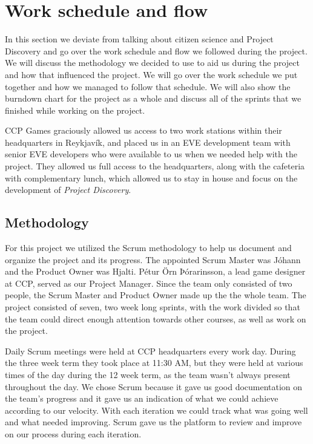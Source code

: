 \section{Work schedule and flow}\label{sec:workscheduleandflow}

In this section we deviate from talking about citizen science and Project Discovery and go over the work schedule and flow we followed during the project. We will discuss the methodology we decided to use to aid us during the project and how that influenced the project. We will go over the work schedule we put together and how we managed to follow that schedule. We will also show the burndown chart for the project as a whole and discuss all of the sprints that we finished while working on the project.

CCP Games graciously allowed us access to two work stations within their headquarters in Reykjavík, and placed us in an EVE development team with senior EVE developers who were available to us when we needed help with the project. They allowed us full access to the headquarters, along with the cafeteria with complementary lunch, which allowed us to stay in house and focus on the development of \emph{Project Discovery}.

\subsection{Methodology}
	For this project we utilized the Scrum methodology to help us document and organize the project and its progress. The appointed Scrum Master was Jóhann and the Product Owner was Hjalti. Pétur Örn Þórarinsson, a lead game designer at CCP, served as our Project Manager. Since the team only consisted of two people, the Scrum Master and Product Owner made up the the whole team. The project consisted of seven, two week long sprints, with the work divided so that the team could direct enough attention towards other courses, as well as work on the project.

	Daily Scrum meetings were held at CCP headquarters every work day. During the three week term they took place at 11:30 AM, but they were held at various times of the day during the 12 week term, as the team wasn't always present throughout the day. We chose Scrum because it gave us good documentation on the team's progress and it gave us an indication of what we could achieve according to our velocity. With each iteration we could track what was going well and what needed improving. Scrum gave us the platform to review and improve on our process during each iteration.


